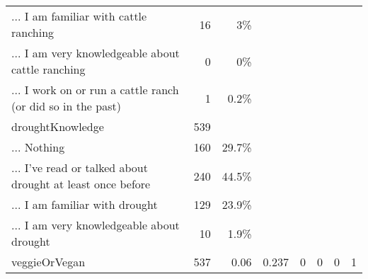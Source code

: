 \begin{table}[!htbp]
{\begin{tabular}{lrrrrrrr}
... I am familiar with cattle ranching & 16 & 3\% &  &  &  &  &  \\ 
... I am very knowledgeable about cattle ranching & 0 & 0\% &  &  &  &  &  \\ 
... I work on or run a cattle ranch (or did so in the past) & 1 & 0.2\% &  &  &  &  &  \\ 
droughtKnowledge & 539 &  &  &  &  &  &  \\ 
... Nothing & 160 & 29.7\% &  &  &  &  &  \\ 
... I've read or talked about drought at least once before & 240 & 44.5\% &  &  &  &  &  \\ 
... I am familiar with drought & 129 & 23.9\% &  &  &  &  &  \\ 
... I am very knowledgeable about drought & 10 & 1.9\% &  &  &  &  &  \\ 
veggieOrVegan & 537 & 0.06 & 0.237 & 0 & 0 & 0 & 1\\ 
\hline
\hline
\end{tabular}
}
\end{table}

